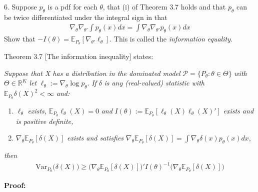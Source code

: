 \documentclass[10pt]{article}
\begin{document}
\newpage 

6. Suppose $p_\theta $ is a pdf for each $\theta $, that (i) of Theorem 3.7 holds and that $p_\theta $ can be twice differentiated under the integral sign in that 
\begin{gather*}
    \nabla_\theta\nabla_{\theta'}\int p_\theta(x) dx = \int\nabla_\theta\nabla_{\theta'}p_\theta(x) dx
\end{gather*}
Show that $-I(\theta) = \mathbb{E}_{P_\theta}[\nabla_{\theta'}\ell_\theta]$. This is called the \textit{information equality}.

Theorem 3.7 [The information inequality] states:

\textit{Suppose that X has a distribution in the dominated model }$\mathcal{P} = \{P_\theta : \theta\in\Theta\}$\textit{ with }$\Theta\in \mathbb{R}^K $\textit{ let }$\ell_\theta := \nabla_\theta\log p_\theta $. \textit{ If  }$\delta $ \textit{ is any (real-valued) statistic with }$\mathbb{E}_{P_\theta}\delta(X)^2 < \infty $ \textit{ and:}
\begin{enumerate}[label=(\roman*)]
    \item $\ell_\theta $ \textit{ exists, }$\mathbb{E}_{P_\theta}\ell_\theta(X) = 0 $ \textit{ and }$I(\theta) := \mathbb{E}_{P_\theta}[\ell_\theta(X)\ell_\theta(X)']$ \textit{ exists and is positive definite,}
    \item $\nabla_\theta \mathbb{E}_{P_\theta}[\delta(X)]$\textit{ exists and satisfies }$\nabla_\theta \mathbb{E}_{P_\theta}[\delta(X)] = \int\nabla_\theta\delta(x)p_\theta(x) dx $,
\end{enumerate}
\textit{then}
\begin{gather*}
    \text{Var}_{P_\theta}\big(\delta(X)\big) \ge \big(\nabla_\theta \mathbb{E}_{P_\theta}[\delta(X)]\big)'I(\theta)^{-1}\big(\nabla_\theta \mathbb{E}_{P_\theta}[\delta(X)]\big)
\end{gather*}

\textbf{Proof:}
\end{document}
